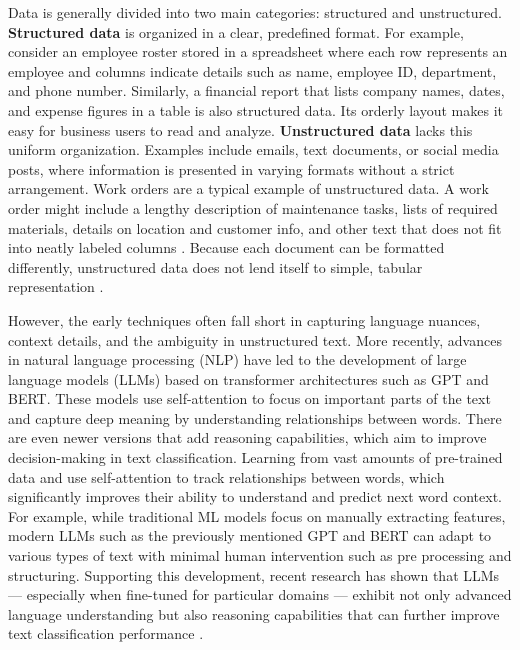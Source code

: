 Data is generally divided into two main categories: structured and unstructured. \textbf{Structured data} is organized in a clear, predefined format. For example, consider an employee roster stored in a spreadsheet where each row represents an employee and columns indicate details such as name, employee ID, department, and phone number. Similarly, a financial report that lists company names, dates, and expense figures in a table is also structured data. Its orderly layout makes it easy for business users to read and analyze. \textbf{Unstructured data} lacks this uniform organization. Examples include emails, text documents, or social media posts, where information is presented in varying formats without a strict arrangement. Work orders are a typical example of unstructured data. A work order might include a lengthy description of maintenance tasks, lists of required materials, details on location and customer info, and other text that does not fit into neatly labeled columns \cite{ibm2023work}. Because each document can be formatted differently, unstructured data does not lend itself to simple, tabular representation \cite{ibm2025datadiff}.

However, the early techniques often fall short in capturing language nuances, context details, and the ambiguity in unstructured text. More recently, advances in natural language processing (NLP) have led to the development of large language models (LLMs) based on transformer architectures such as GPT and BERT. These models use self-attention to focus on important parts of the text and capture deep meaning by understanding relationships between words. There are even newer versions that add reasoning capabilities, which aim to improve decision-making in text classification. Learning from vast amounts of pre-trained data and use self-attention to track relationships between words, which significantly improves their ability to understand and predict next word context. For example, while traditional ML models focus on manually extracting features, modern LLMs such as the previously mentioned GPT and BERT can adapt to various types of text with minimal human intervention such as pre processing and structuring. Supporting this development, recent research has shown that LLMs --- especially when fine-tuned for particular domains --- exhibit not only advanced language understanding but also reasoning capabilities that can further improve text classification performance \cite{huang2024classification, andersson2024ikea, merritt2022transformer, nazyrova2024medical, wang2024classifiers}.

